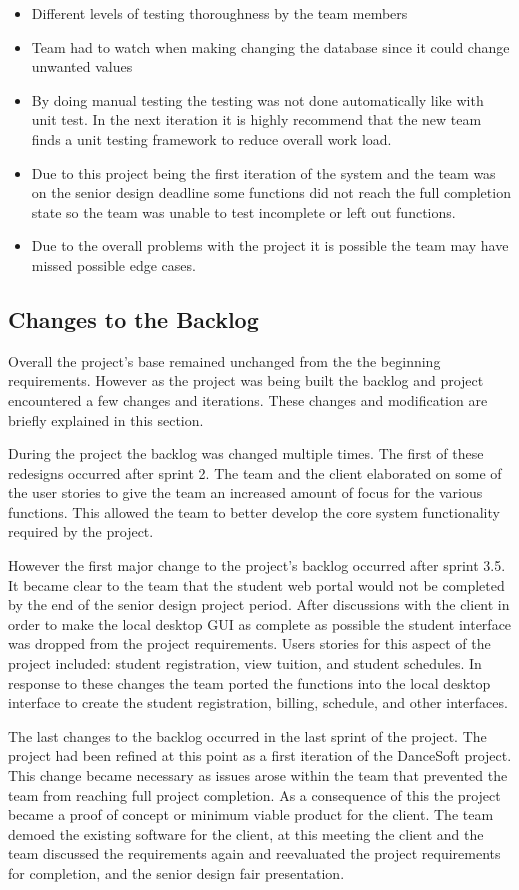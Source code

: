 \begin{itemize}
\item Different levels of testing thoroughness by the team members
\item Team had to watch when making changing the database since it could change unwanted values
\item By doing manual testing the testing was not done automatically like with unit test. In the next iteration it is highly recommend that the new team finds a unit testing framework to reduce overall work load.
\item Due to this project being the first iteration of the system and the team was on the senior design deadline some functions did not reach the full completion state so the team was unable to test incomplete or left out functions.
\item Due to the overall problems with the project it is possible the team may have missed possible edge cases. 
\end{itemize}


\subsection{Changes to the Backlog}
Overall the project's base remained unchanged from the the beginning requirements. However as the project was being built the backlog and project encountered a few changes and iterations. These changes and modification are briefly explained in this section. 

During the project the backlog was changed multiple times. The first of these redesigns occurred after sprint 2. The team and the client elaborated on some of the user stories to give the team an increased amount of focus for the various functions. This allowed the team to better develop the core system functionality required by the project.

However the first major change to the project's backlog occurred after sprint 3.5. It became clear to the team that the student web portal would not be completed by the end of the senior design project period. After discussions with the client in order to make the local desktop GUI as complete as possible the student interface was dropped from the project requirements. Users stories for this aspect of the project included: student registration, view tuition, and student schedules. In response to these changes the team ported the functions into the local desktop interface to create the student registration, billing, schedule, and other interfaces.

The last changes to the backlog occurred in the last sprint of the project. The project had been refined at this point as a first iteration of the DanceSoft project. This change became necessary as issues arose within the team that prevented the team from reaching full project completion. As a consequence of this the project became a proof of concept or minimum viable product for the client. The team demoed the existing software for the client, at this meeting the client and the team discussed the requirements again and reevaluated the project requirements for completion, and the senior design fair presentation. 

